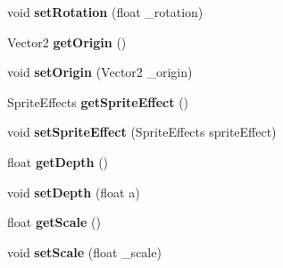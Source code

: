 \begin{DoxyCompactItemize}
\item 
\hypertarget{class_tile_engine_1_1_tile_aaa04418a5a8dcc9bebb87ac53ee278db}{void {\bfseries set\-Rotation} (float \-\_\-rotation)}\label{class_tile_engine_1_1_tile_aaa04418a5a8dcc9bebb87ac53ee278db}

\item 
\hypertarget{class_tile_engine_1_1_tile_a6bd3dcc3dd10b029cd85088658106014}{Vector2 {\bfseries get\-Origin} ()}\label{class_tile_engine_1_1_tile_a6bd3dcc3dd10b029cd85088658106014}

\item 
\hypertarget{class_tile_engine_1_1_tile_ae91093977a19c40af47893a383b21a7b}{void {\bfseries set\-Origin} (Vector2 \-\_\-origin)}\label{class_tile_engine_1_1_tile_ae91093977a19c40af47893a383b21a7b}

\item 
\hypertarget{class_tile_engine_1_1_tile_a0c3b54ce1eb5944056e03a50a0a4347b}{Sprite\-Effects {\bfseries get\-Sprite\-Effect} ()}\label{class_tile_engine_1_1_tile_a0c3b54ce1eb5944056e03a50a0a4347b}

\item 
\hypertarget{class_tile_engine_1_1_tile_a4e99f01cfc6d9d48a588891bd0fd1eaa}{void {\bfseries set\-Sprite\-Effect} (Sprite\-Effects sprite\-Effect)}\label{class_tile_engine_1_1_tile_a4e99f01cfc6d9d48a588891bd0fd1eaa}

\item 
\hypertarget{class_tile_engine_1_1_tile_a1a7950d049cdda64f4d6c8d3ea9c6dd9}{float {\bfseries get\-Depth} ()}\label{class_tile_engine_1_1_tile_a1a7950d049cdda64f4d6c8d3ea9c6dd9}

\item 
\hypertarget{class_tile_engine_1_1_tile_aa6bd1b1cf9ecacf8a31e77aa924fa46e}{void {\bfseries set\-Depth} (float a)}\label{class_tile_engine_1_1_tile_aa6bd1b1cf9ecacf8a31e77aa924fa46e}

\item 
\hypertarget{class_tile_engine_1_1_tile_adb8ab716f690fd85f35ca86d2317cb2d}{float {\bfseries get\-Scale} ()}\label{class_tile_engine_1_1_tile_adb8ab716f690fd85f35ca86d2317cb2d}

\item 
\hypertarget{class_tile_engine_1_1_tile_af2da0c551f70034307d1d9e9f5cc1301}{void {\bfseries set\-Scale} (float \-\_\-scale)}\label{class_tile_engine_1_1_tile_af2da0c551f70034307d1d9e9f5cc1301}

\end{DoxyCompactItemize}
